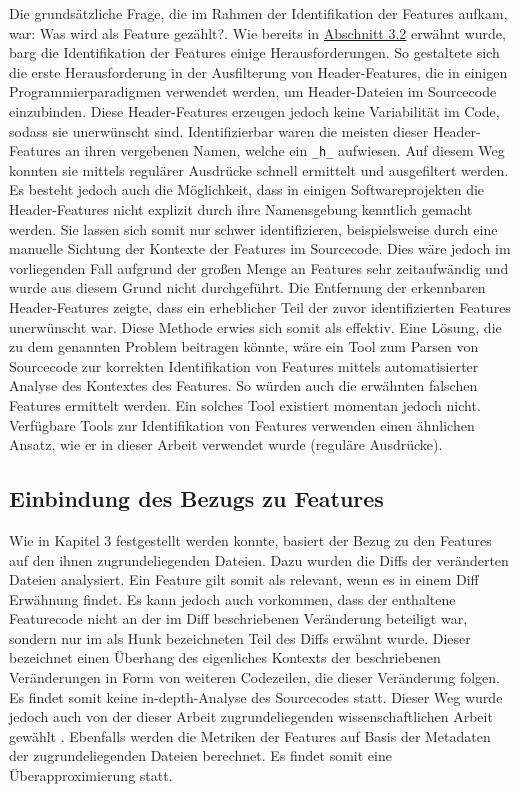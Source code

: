 Die grundsätzliche Frage, die im Rahmen der Identifikation der Features aufkam, war: \glqq Was wird als Feature gezählt?\grqq. Wie bereits in \hyperref[construction]{Abschnitt 3.2} erwähnt wurde, barg die Identifikation der Features einige Herausforderungen. So gestaltete sich die erste Herausforderung in der Ausfilterung von \glqq Header-Features\grqq{}, die in einigen Programmierparadigmen verwendet werden, um Header-Dateien im Sourcecode einzubinden. Diese Header-Features erzeugen jedoch keine Variabilität im Code, sodass sie unerwünscht sind. Identifizierbar waren die meisten dieser Header-Features an ihren vergebenen Namen, welche ein \texttt{\_h\_} aufwiesen. Auf diesem Weg konnten sie mittels regulärer Ausdrücke schnell ermittelt und ausgefiltert werden. Es besteht jedoch auch die Möglichkeit, dass in einigen Softwareprojekten die Header-Features nicht explizit durch ihre Namensgebung kenntlich gemacht werden. Sie lassen sich somit nur schwer identifizieren, beispielsweise durch eine manuelle Sichtung der Kontexte der Features im Sourcecode. Dies wäre jedoch im vorliegenden Fall aufgrund der großen Menge an Features sehr zeitaufwändig und wurde aus diesem Grund nicht durchgeführt. Die Entfernung der erkennbaren Header-Features zeigte, dass ein erheblicher Teil der zuvor identifizierten Features unerwünscht war. Diese Methode erwies sich somit als effektiv.
Eine Lösung, die zu dem genannten Problem beitragen könnte, wäre ein Tool zum Parsen von Sourcecode zur korrekten Identifikation von Features mittels automatisierter Analyse des Kontextes des Features. So würden auch die erwähnten \glqq falschen\grqq{} Features ermittelt werden. Ein solches Tool existiert momentan jedoch nicht. Verfügbare Tools zur Identifikation von Features verwenden einen ähnlichen Ansatz, wie er in dieser Arbeit verwendet wurde (reguläre Ausdrücke).

\subsection*{Einbindung des Bezugs zu Features}
Wie in Kapitel 3 festgestellt werden konnte, basiert der Bezug zu den Features auf den ihnen zugrundeliegenden Dateien. Dazu wurden die Diffs der veränderten Dateien analysiert. Ein Feature gilt somit als relevant, wenn es in einem Diff Erwähnung findet. Es kann jedoch auch vorkommen, dass der enthaltene Featurecode nicht an der im Diff beschriebenen Veränderung beteiligt war, sondern nur im als \glqq Hunk\grqq{} bezeichneten Teil des Diffs erwähnt wurde. Dieser bezeichnet einen Überhang des eigenliches Kontexts der beschriebenen Veränderungen in Form von weiteren Codezeilen, die dieser Veränderung folgen. Es findet somit keine \glqq in-depth\grqq -Analyse des Sourcecodes statt. Dieser Weg wurde jedoch auch von der dieser Arbeit zugrundeliegenden wissenschaftlichen Arbeit gewählt \cite{Queiroz2016}. Ebenfalls werden die Metriken der Features auf Basis der Metadaten der zugrundeliegenden Dateien berechnet. Es findet somit eine Überapproximierung statt.


